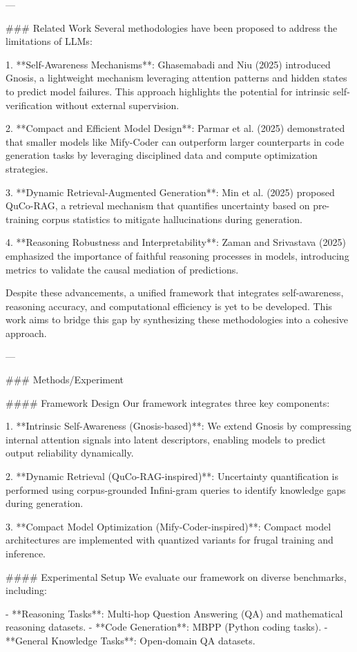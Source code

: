 ---

### Related Work  
Several methodologies have been proposed to address the limitations of LLMs:

1. **Self-Awareness Mechanisms**: Ghasemabadi and Niu (2025) introduced Gnosis, a lightweight mechanism leveraging attention patterns and hidden states to predict model failures. This approach highlights the potential for intrinsic self-verification without external supervision.

2. **Compact and Efficient Model Design**: Parmar et al. (2025) demonstrated that smaller models like Mify-Coder can outperform larger counterparts in code generation tasks by leveraging disciplined data and compute optimization strategies.

3. **Dynamic Retrieval-Augmented Generation**: Min et al. (2025) proposed QuCo-RAG, a retrieval mechanism that quantifies uncertainty based on pre-training corpus statistics to mitigate hallucinations during generation.

4. **Reasoning Robustness and Interpretability**: Zaman and Srivastava (2025) emphasized the importance of faithful reasoning processes in models, introducing metrics to validate the causal mediation of predictions.

Despite these advancements, a unified framework that integrates self-awareness, reasoning accuracy, and computational efficiency is yet to be developed. This work aims to bridge this gap by synthesizing these methodologies into a cohesive approach.

---

### Methods/Experiment  

#### Framework Design  
Our framework integrates three key components:  

1. **Intrinsic Self-Awareness (Gnosis-based)**: We extend Gnosis by compressing internal attention signals into latent descriptors, enabling models to predict output reliability dynamically.

2. **Dynamic Retrieval (QuCo-RAG-inspired)**: Uncertainty quantification is performed using corpus-grounded Infini-gram queries to identify knowledge gaps during generation.

3. **Compact Model Optimization (Mify-Coder-inspired)**: Compact model architectures are implemented with quantized variants for frugal training and inference.

#### Experimental Setup  
We evaluate our framework on diverse benchmarks, including:  

- **Reasoning Tasks**: Multi-hop Question Answering (QA) and mathematical reasoning datasets.  
- **Code Generation**: MBPP (Python coding tasks).  
- **General Knowledge Tasks**: Open-domain QA datasets.

